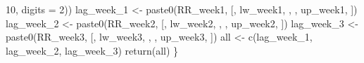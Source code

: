 \documentclass[
]{article}
\newenvironment{Shaded}{\begin{snugshade}}{\end{snugshade}}
\newcommand{\AttributeTok}[1]{\textcolor[rgb]{0.77,0.63,0.00}{#1}}
\newcommand{\DecValTok}[1]{\textcolor[rgb]{0.00,0.00,0.81}{#1}}
\newcommand{\FunctionTok}[1]{\textcolor[rgb]{0.00,0.00,0.00}{#1}}
\newcommand{\NormalTok}[1]{#1}
\newcommand{\OtherTok}[1]{\textcolor[rgb]{0.56,0.35,0.01}{#1}}
\newcommand{\StringTok}[1]{\textcolor[rgb]{0.31,0.60,0.02}{#1}}
\begin{document}
\begin{Shaded}
\begin{Highlighting}[]
    \DecValTok{10}\NormalTok{, }\AttributeTok{digits =} \DecValTok{2}\NormalTok{))}
\NormalTok{  lag\_week\_1 }\OtherTok{\textless{}{-}} \FunctionTok{paste0}\NormalTok{(RR\_week1, }\StringTok{\textquotesingle{} [\textquotesingle{}}\NormalTok{, lw\_week1, }\StringTok{\textquotesingle{}, \textquotesingle{}}\NormalTok{, up\_week1, }\StringTok{\textquotesingle{}]\textquotesingle{}}\NormalTok{)}
\NormalTok{  lag\_week\_2 }\OtherTok{\textless{}{-}} \FunctionTok{paste0}\NormalTok{(RR\_week2, }\StringTok{\textquotesingle{} [\textquotesingle{}}\NormalTok{, lw\_week2, }\StringTok{\textquotesingle{}, \textquotesingle{}}\NormalTok{, up\_week2, }\StringTok{\textquotesingle{}]\textquotesingle{}}\NormalTok{)}
\NormalTok{  lag\_week\_3 }\OtherTok{\textless{}{-}} \FunctionTok{paste0}\NormalTok{(RR\_week3, }\StringTok{\textquotesingle{} [\textquotesingle{}}\NormalTok{, lw\_week3, }\StringTok{\textquotesingle{}, \textquotesingle{}}\NormalTok{, up\_week3, }\StringTok{\textquotesingle{}]\textquotesingle{}}\NormalTok{)}
\NormalTok{  all }\OtherTok{\textless{}{-}} \FunctionTok{c}\NormalTok{(lag\_week\_1, lag\_week\_2, lag\_week\_3)}
  \FunctionTok{return}\NormalTok{(all)}
\NormalTok{\}}
\end{Highlighting}
\end{Shaded}
\end{document}
